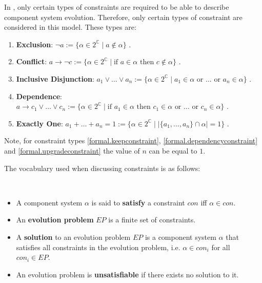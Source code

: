 In \modelname, only certain types of constraints are required to be able to describe component system evolution.
Therefore, only certain types of constraint are considered in this model.
These types are:
\begin{enumerate}
  \item \textbf{Exclusion}: $\neg a := \{\alpha \in 2^{\mathbb{C}} \mid a \not \in \alpha \}$ \label{formal.removeconstraint}.
  \item \textbf{Conflict}: $a \rightarrow \neg c := \{\alpha \in 2^{\mathbb{C}} \mid \mbox{if } a \in \alpha \mbox{ then } c \not \in \alpha\}$ \label{formal.conflictconstraint}.
  \item \textbf{Inclusive Disjunction}: $a_1 \vee \ldots \vee a_n := \{\alpha \in 2^{\mathbb{C}} \mid a_1 \in \alpha \mbox{ or }\ldots \mbox{ or } a_n \in \alpha\}$ \label{formal.keepconstraint}.
  \item \textbf{Dependence}: $a \rightarrow c_1 \vee \ldots \vee c_n := \{\alpha \in 2^{\mathbb{C}} \mid \mbox{if } a_1 \in \alpha \mbox{ then }  c_1 \in \alpha \mbox{ or } \ldots \mbox{ or } c_n \in \alpha\}$ \label{formal.dependencyconstraint}.
  \item \textbf{Exactly One}: $a_1 + \ldots + a_n = 1 := \{\alpha \in 2^{\mathbb{C}} \mid |\{a_1,\ldots,a_n\} \cap \alpha| = 1\}$ \label{formal.upgradeconstraint}.
\end{enumerate}
Note, for constraint types \ref{formal.keepconstraint}, \ref{formal.dependencyconstraint} and \ref{formal.upgradeconstraint} the value of $n$ can be equal to $1$.

The vocabulary used when discussing constraints is as follows:
\begin{defs}
\label{formal.constraintdefs}
{\ }
\begin{itemize}
  \item A component system $\alpha$ is said to \textbf{satisfy} a constraint $con$ iff $\alpha \in con$.
  \item An \textbf{evolution problem} $EP$ is a finite set of constraints.
  \item A \textbf{solution} to an evolution problem $EP$ is a component system  $\alpha$  that satisfies all constraints in the evolution problem, i.e. $\alpha \in con_i$ for all $con_i \in EP$.
  \item An evolution problem is \textbf{unsatisfiable} if there exists no solution to it.  
\end{itemize}
\end{defs}

